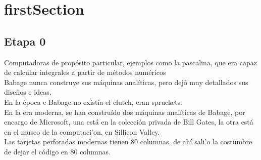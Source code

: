 \newpage

\chapter{\acrlong{firstSection}}
\section{Etapa 0}

Computadoras de prop\'{o}sito particular, ejemplos como la pascalina, que era capaz de calcular integrales a partir de m\'{e}todos num\'{e}ricos\\
Babage nunca construye sus m\'{a}quinas anal\'{i}ticas, pero dej\'{o} muy detallados sus dise\~{n}os e ideas.\\
En la \'{e}poca e Babage no exist\'{i}a el clutch, eran spruckets.\\
En la era moderna, se han constru\'{i}do dos m\'{a}quinas anal\'{i}ticas de Babage, por encargo de Microsoft, una est\'{a} en la colecci\'{o}n privada de Bill Gates, la otra est\'{a} en el museo de la computaci'{o}n, en Sillicon Valley.\\ %
Las tarjetas perforadas modernas tienen 80 columnas, de ah\'{i} sali'{o} la costumbre de dejar el c\'{o}digo en 80 columnas.